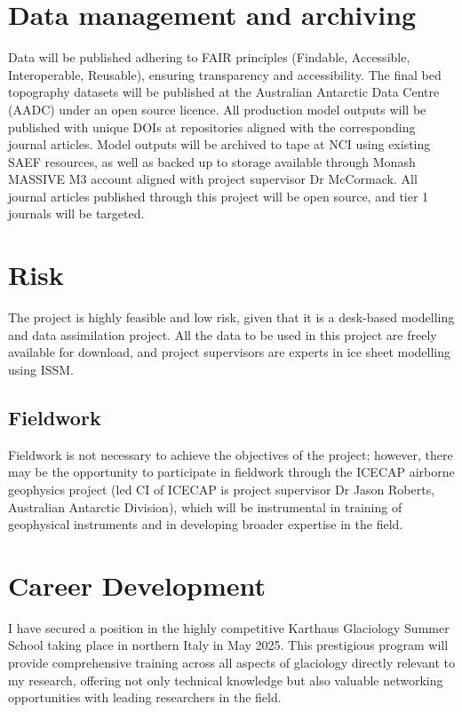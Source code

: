 \section*{Data management and archiving}

Data will be published adhering to FAIR principles (Findable, Accessible, Interoperable, Reusable), ensuring transparency and accessibility. The final bed topography datasets will be published at the Australian Antarctic Data Centre (AADC) under an open source licence. All production model outputs will be published with unique DOIs at repositories aligned with the corresponding journal articles. Model outputs will be archived to tape at NCI using existing SAEF resources, as well as backed up to storage available through Monash MASSIVE M3 account aligned with project supervisor Dr McCormack. All journal articles published through this project will be open source, and tier 1 journals will be targeted.

\section*{Risk}

The project is highly feasible and low risk, given that it is a desk-based modelling and data assimilation project. All the data to be used in this project are freely available for download, and project supervisors are experts in ice sheet modelling using ISSM. 

\subsection*{Fieldwork}
Fieldwork is not necessary to achieve the objectives of the project; however, there may be the opportunity to participate in fieldwork through the ICECAP airborne geophysics project (led CI of ICECAP is project supervisor Dr Jason Roberts, Australian Antarctic Division), which will be instrumental in training of geophysical instruments and in developing broader expertise in the field.

\section*{Career Development}

I have secured a position in the highly competitive Karthaus Glaciology Summer School taking place in northern Italy in May 2025. This prestigious program will provide comprehensive training across all aspects of glaciology directly relevant to my research, offering not only technical knowledge but also valuable networking opportunities with leading researchers in the field.